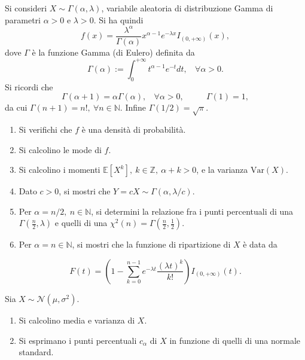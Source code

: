 Si consideri $X\sim \Gamma ( \alpha ,\lambda )$, variabile aleatoria di distribuzione Gamma di parametri $\alpha  >0$ e $\lambda  >0$. Si ha quindi
\begin{equation*}
f( x) =\frac{\lambda ^{\alpha }}{\Gamma ( \alpha )} x^{\alpha -1} e^{-\lambda x} I_{( 0,+\infty )}( x) ,
\end{equation*}
dove $\Gamma $ è la funzione Gamma (di Eulero) definita da
\begin{equation*}
\Gamma ( \alpha ) :=\int _{0}^{+\infty } t^{\alpha -1} e^{-t} dt,\ \ \ \ \forall \alpha  >0.
\end{equation*}
Si ricordi che
\begin{equation*}
\Gamma ( \alpha +1) =\alpha \Gamma ( \alpha ) ,\ \ \ \ \forall \alpha  >0,\ \ \ \ \ \ \ \ \ \ \ \ \Gamma ( 1) =1,
\end{equation*}
da cui $\Gamma ( n+1) =n!,\ \forall n\in \mathbb{N}$. Infine $\Gamma ( 1/2) =\sqrt{\pi }$.
\begin{enumerate}
\item Si verifichi che $f$ è una densità di probabilità.
\item Si calcolino le mode di $f$.
\item Si calcolino i momenti $\mathbb{E}\left[ X^{k}\right] ,\ k\in \mathbb{Z} ,\ \alpha +k >0$, e la varianza $\mathrm{Var}( X)$.
\item Dato $c >0$, si mostri che $Y=cX\sim \Gamma ( \alpha ,\lambda /c)$.
\item Per $\alpha =n/2,\ n\in \mathbb{N}$, si determini la relazione fra i punti percentuali di una $\Gamma \left(\frac{n}{2} ,\lambda \right)$ e quelli di una $\chi ^{2}( n) =\Gamma \left(\frac{n}{2} ,\frac{1}{2}\right)$.
\item Per $\alpha =n\in \mathbb{N}$, si mostri che la funzione di ripartizione di $X$ è data da
\end{enumerate}
\begin{equation*}
F( t) =\left( 1-\sum\limits _{k=0}^{n-1} e^{-\lambda t}\frac{( \lambda t)^{k}}{k!}\right) I_{( 0,+\infty )}( t) .
\end{equation*}

Sia $X\sim \mathcal{N}\left( \mu ,\sigma ^{2}\right)$.
\begin{enumerate}
\item Si calcolino media e varianza di $X$.
\item Si esprimano i punti percentuali $c_{\alpha }$ di $X$ in funzione di quelli di una normale standard.
\end{enumerate}

